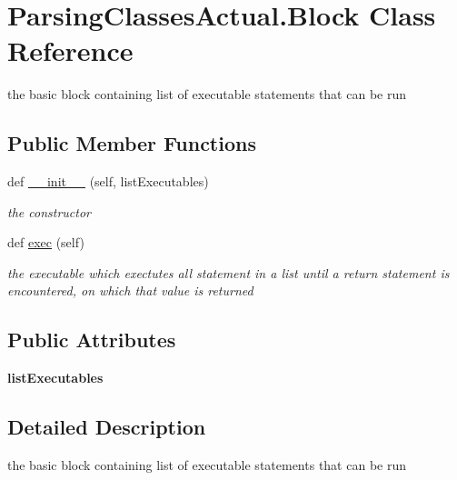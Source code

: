 \hypertarget{class_parsing_classes_actual_1_1_block}{}\section{Parsing\+Classes\+Actual.\+Block Class Reference}
\label{class_parsing_classes_actual_1_1_block}


the basic block containing list of executable statements that can be run  


\subsection*{Public Member Functions}
\begin{DoxyCompactItemize}
\item 
def \hyperlink{class_parsing_classes_actual_1_1_block_ac422058e3330cd4d72e14a3691037415}{\+\_\+\+\_\+init\+\_\+\+\_\+} (self, list\+Executables)
\begin{DoxyCompactList}\small\item\em the constructor \end{DoxyCompactList}\item 
\mbox{\label{class_parsing_classes_actual_1_1_block_a9023ee93ba05105f1f9fe5f3014c347f}} 
def \hyperlink{class_parsing_classes_actual_1_1_block_a9023ee93ba05105f1f9fe5f3014c347f}{exec} (self)
\begin{DoxyCompactList}\small\item\em the executable which exectutes all statement in a list until a return statement is encountered, on which that value is returned \end{DoxyCompactList}\end{DoxyCompactItemize}
\subsection*{Public Attributes}
\begin{DoxyCompactItemize}
\item 
\mbox{\label{class_parsing_classes_actual_1_1_block_aac2c93f155a9e39693fd55cf62c5003d}} 
{\bfseries list\+Executables}
\end{DoxyCompactItemize}


\subsection{Detailed Description}
the basic block containing list of executable statements that can be run 

